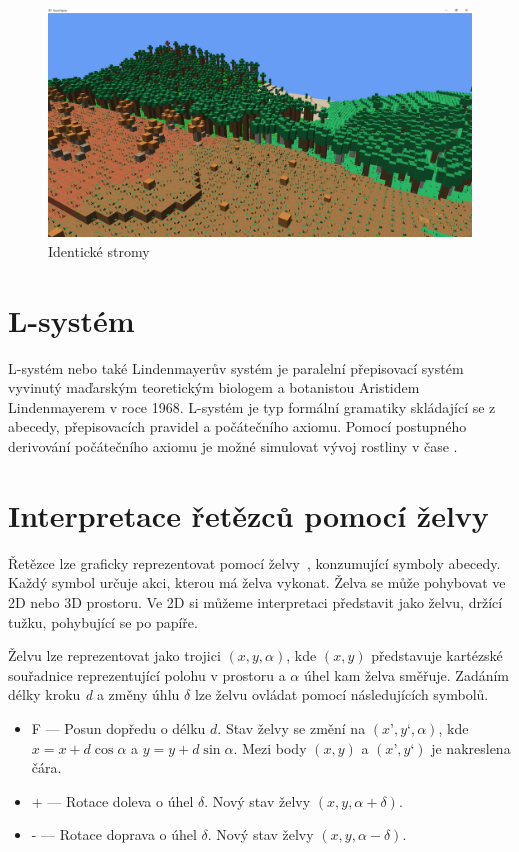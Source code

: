 \documentclass[thesis=M,czech]{FITthesis}[2019/12/23]
\begin{document}
\begin{figure}\centering
	\includegraphics[width=\textwidth]{images/identical_trees}
	\caption[Identické stromy]{Identické stromy}\label{fig:identicke_stromy}
\end{figure}

\section{L-systém}
L-systém nebo také Lindenmayerův systém je paralelní přepisovací systém vyvinutý maďarským teoretickým biologem a botanistou Aristidem Lindenmayerem v roce 1968. L-systém je typ formální gramatiky skládající se z abecedy, přepisovacích pravidel a počátečního axiomu. Pomocí postupného derivování počátečního axiomu je možné simulovat vývoj rostliny v čase \cite{pcgbook75}.

\section{Interpretace řetězců pomocí želvy}
Řetězce lze graficky reprezentovat pomocí želvy~\cite{turtle_basics}, konzumující symboly abecedy. Každý symbol určuje akci, kterou má želva vykonat. Želva se může pohybovat ve 2D nebo 3D prostoru. Ve 2D si můžeme interpretaci představit jako želvu, držící tužku, pohybující se po papíře.

Želvu lze reprezentovat jako trojici $(x, y, \alpha)$, kde $(x, y)$ představuje kartézské souřadnice reprezentující polohu v prostoru a $\alpha$ úhel kam želva směřuje. Zadáním délky kroku \textit{d} a změny úhlu $\delta$ lze želvu ovládat pomocí následujících symbolů.

\begin{itemize}
\item F --- Posun dopředu o délku $d$. Stav želvy se změní na $(x’, y‘, \alpha)$, kde $x = x + d \cos \alpha$ a $y = y + d \sin \alpha$. Mezi body $(x, y)$ a $(x’, y‘)$ je nakreslena čára.
\item + --- Rotace doleva o úhel $\delta$. Nový stav želvy $(x, y, \alpha + \delta)$.
\item - --- Rotace doprava o úhel $\delta$. Nový stav želvy $(x, y, \alpha - \delta)$.
\end{itemize}
\end{document}
